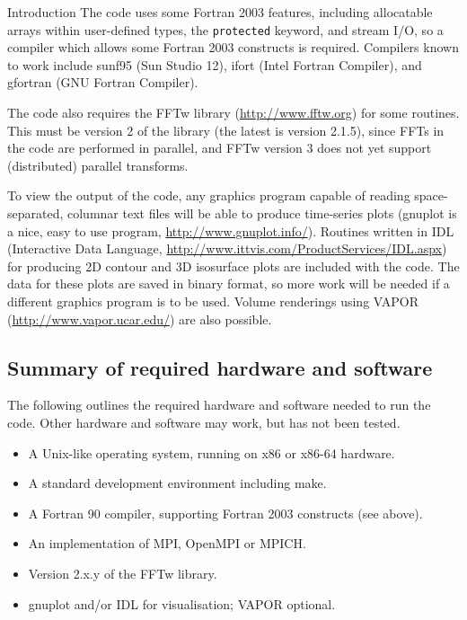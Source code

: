 \begin{chapter}{\label{cha:introduction}Introduction}
  The code uses some Fortran 2003 features, including allocatable arrays within
  user-defined types, the \verb"protected" keyword, and stream I/O, so a
  compiler which allows some Fortran 2003 constructs is required.  Compilers
  known to work include sunf95 (Sun Studio 12), ifort (Intel Fortran Compiler),
  and gfortran (GNU Fortran Compiler).

  The code also requires the FFTw library (\url{http://www.fftw.org}) for some
  routines.  This must be version 2 of the library (the latest is version
  2.1.5), since FFTs in the code are performed in parallel, and FFTw version 3
  does not yet support (distributed) parallel transforms.

  To view the output of the code, any graphics program capable of reading
  space-separated, columnar text files will be able to produce time-series
  plots (gnuplot is a nice, easy to use program,
  \url{http://www.gnuplot.info/}).  Routines written in IDL (Interactive Data
  Language, \url{http://www.ittvis.com/ProductServices/IDL.aspx}) for producing
  2D contour and 3D isosurface plots are included with the code.  The data for
  these plots are saved in binary format, so more work will be needed if a
  different graphics program is to be used.  Volume renderings using VAPOR
  (\url{http://www.vapor.ucar.edu/}) are also possible.

  \subsection{Summary of required hardware and software}
  The following outlines the required hardware and software needed to run the
  code.  Other hardware and software may work, but has not been tested.
  \begin{itemize}
    \item A Unix-like operating system, running on x86 or x86-64 hardware.
    \item A standard development environment including make.
    \item A Fortran 90 compiler, supporting Fortran 2003 constructs (see
      above).
    \item An implementation of MPI, \eg OpenMPI or MPICH.
    \item Version 2.x.y of the FFTw library.
    \item gnuplot and/or IDL for visualisation; VAPOR optional.
  \end{itemize}


\end{chapter}
